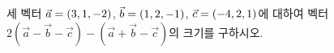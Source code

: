 세 벡터 $\vec{a}=(3{,}\mkern3mu\mathopen{}1{,}\mkern3mu\mathopen{}-2)$, $\vec{b}=(1{,}\mkern3mu\mathopen{}2{,}\mkern3mu\mathopen{}-1)$, $\vec{c}=(-4{,}\mkern3mu\mathopen{}2{,}\mkern3mu\mathopen{}1)$에 대하여 벡터 $2(\vec{a}-\vec{b}-\vec{c})-(\vec{a}+\vec{b}-\vec{c})$의 크기를 구하시오.
